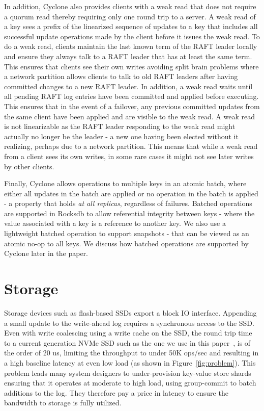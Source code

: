 \documentclass[twocolumn]{article}
\begin{document}
In addition, Cyclone also provides clients with a weak read that does not require a 
quorum read thereby requiring only one round trip to a server.  A weak read of a key sees a 
prefix of the linearized sequence of updates to a key that includes all successful update operations made 
by the client before it issues the weak read. To do a weak read, 
clients maintain the last known term of the RAFT leader locally and ensure they always talk
to a RAFT leader that has at least the same term. This ensures that clients see their own writes
avoiding split brain problems where a network partition allows clients to
talk to old RAFT leaders after having committed changes to a new RAFT leader. In addition, a weak 
read waits until all pending RAFT log entries have been committed and applied before executing. 
This ensures that in the event of a failover, any previous committed updates from the same client 
have been applied and are visible to the weak read. A weak read is not linearizable as the RAFT 
leader responding to the weak read might actually no longer be the leader - a new one having been 
elected without it realizing, perhaps due to a network partition. This means that while a weak read 
from a client sees its own writes, in some rare cases it might not see later writes by other clients.

Finally, Cyclone allows operations to multiple keys in an atomic batch, where
either all updates in the batch are applied or no operation in the batch is
applied - a property that holds \emph{at all replicas}, regardless of failures. Batched operations 
are supported in Rocksdb to allow referential integrity between keys - where the value associated
with a  key is a reference to another key. We also use a lightweight batched operation to support 
snapshots - that can be viewed as an atomic no-op to all keys. We discuss how batched operations are 
supported by Cyclone later in the paper.

\section{Storage}
\label{sec:storage}
Storage devices such as flash-based SSDs export a block IO interface. Appending
a small update to the write-ahead log requires a synchronous access to the
SSD. Even with write coalescing using a write cache on the SSD, the round trip
time to a current generation NVMe SSD such as the one we use in this
paper~\cite{ssd_spec}, is of the order of 20 us, limiting the throughput to
under 50K ops/sec and resulting in a high baseline latency at even low load (as
shown in Figure~\ref{fig:problem}). This problem leads many system designers to
under-provision key-value store shards ensuring that it operates at moderate to
high load, using group-commit to batch additions to the log. They therefore pay
a price in latency to ensure the bandwidth to storage is fully utilized.
\end{document}
